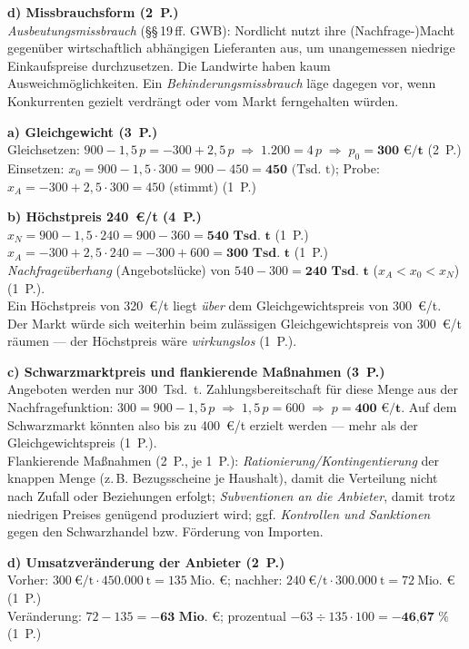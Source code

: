 \begin{loesung}[title={Lösung Aufgabe~2.3 --- Fusionskontrolle und Missbrauchsaufsicht}]
\textbf{d) Missbrauchsform (2~P.)}\\
\emph{Ausbeutungsmissbrauch} (\S\S\,19\,ff. GWB): Nordlicht nutzt ihre (Nachfrage-)Macht
gegenüber wirtschaftlich abhängigen Lieferanten aus, um unangemessen niedrige
Einkaufspreise durchzusetzen. Die Landwirte haben kaum Ausweichmöglichkeiten. Ein
\emph{Behinderungsmissbrauch} läge dagegen vor, wenn Konkurrenten gezielt verdrängt oder
vom Markt ferngehalten würden.
\end{loesung}

\begin{loesung}[title={Lösung Aufgabe~2.4 --- Höchstpreis auf dem Pelletmarkt}]
\textbf{a) Gleichgewicht (3~P.)}\\
Gleichsetzen: $900 - 1{,}5\,p = -300 + 2{,}5\,p \;\Rightarrow\; 1.200 = 4\,p
\;\Rightarrow\; p_0 = \textbf{300~€/t}$ (2~P.)\\
Einsetzen: $x_0 = 900 - 1{,}5 \cdot 300 = 900 - 450 = \textbf{450} \text{ (Tsd.~t)}$;
Probe: $x_A = -300 + 2{,}5 \cdot 300 = 450$ (stimmt) (1~P.)

\textbf{b) Höchstpreis 240~€/t (4~P.)}\\
$x_N = 900 - 1{,}5 \cdot 240 = 900 - 360 = \textbf{540 Tsd.~t}$ (1~P.)\\
$x_A = -300 + 2{,}5 \cdot 240 = -300 + 600 = \textbf{300 Tsd.~t}$ (1~P.)\\
\emph{Nachfrageüberhang} (Angebotslücke) von $540 - 300 = \textbf{240 Tsd.~t}$
($x_A < x_0 < x_N$) (1~P.).\\
Ein Höchstpreis von 320~€/t liegt \emph{über} dem Gleichgewichtspreis von 300~€/t. Der
Markt würde sich weiterhin beim zulässigen Gleichgewichtspreis von 300~€/t räumen --- der
Höchstpreis wäre \emph{wirkungslos} (1~P.).

\textbf{c) Schwarzmarktpreis und flankierende Maßnahmen (3~P.)}\\
Angeboten werden nur 300~Tsd.~t. Zahlungsbereitschaft für diese Menge aus der
Nachfragefunktion: $300 = 900 - 1{,}5\,p \;\Rightarrow\; 1{,}5\,p = 600
\;\Rightarrow\; p = \textbf{400~€/t}$. Auf dem Schwarzmarkt könnten also bis zu 400~€/t
erzielt werden --- mehr als der Gleichgewichtspreis (1~P.).\\
Flankierende Maßnahmen (2~P., je 1~P.):
\emph{Rationierung/Kontingentierung} der knappen Menge (z.\,B. Bezugsscheine je
Haushalt), damit die Verteilung nicht nach Zufall oder Beziehungen erfolgt;
\emph{Subventionen an die Anbieter}, damit trotz niedrigen Preises genügend produziert
wird; ggf. \emph{Kontrollen und Sanktionen} gegen den Schwarzhandel bzw. Förderung von
Importen.

\textbf{d) Umsatzveränderung der Anbieter (2~P.)}\\
Vorher: $300~\text{€/t} \cdot 450.000~\text{t} = 135~\text{Mio.~€}$;
nachher: $240~\text{€/t} \cdot 300.000~\text{t} = 72~\text{Mio.~€}$ (1~P.)\\
Veränderung: $72 - 135 = \textbf{$-$63~Mio.~€}$; prozentual
$-63 \div 135 \cdot 100 = \textbf{$-$46,67~\%}$ (1~P.)
\end{loesung}

